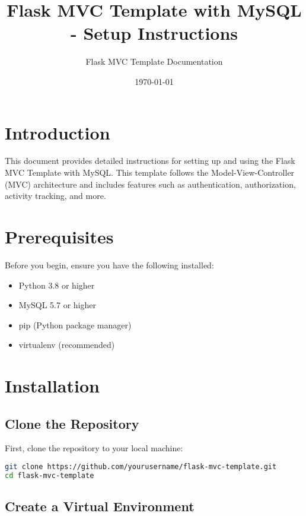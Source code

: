 \documentclass{article}
\title{Flask MVC Template with MySQL - Setup Instructions}
\author{Flask MVC Template Documentation}
\date{\today}
\begin{document}
\maketitle

\tableofcontents
\newpage

\section{Introduction}

This document provides detailed instructions for setting up and using the Flask MVC Template with MySQL. This template follows the Model-View-Controller (MVC) architecture and includes features such as authentication, authorization, activity tracking, and more.

\section{Prerequisites}

Before you begin, ensure you have the following installed:

\begin{itemize}
    \item Python 3.8 or higher
    \item MySQL 5.7 or higher
    \item pip (Python package manager)
    \item virtualenv (recommended)
\end{itemize}

\section{Installation}

\subsection{Clone the Repository}

First, clone the repository to your local machine:

\begin{lstlisting}[language=bash]
git clone https://github.com/yourusername/flask-mvc-template.git
cd flask-mvc-template
\end{lstlisting}

\subsection{Create a Virtual Environment}
\end{document}
